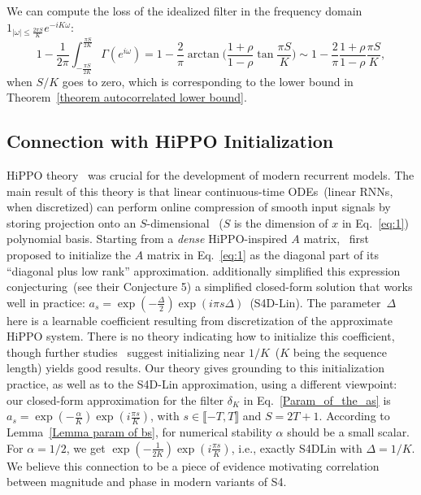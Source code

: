 We can compute the loss of the idealized filter in the frequency domain $1_{|\omega| \leqslant \frac{2\pi S}{K}} e^{-i K \omega }$: 
$$
1 - \frac{1}{2\pi}\int_{-\frac{\pi S}{2K}}^\frac{\pi S}{2K} \Gamma(e^{i\omega}) = 
1 - \frac{2}{\pi}
\arctan \Big(
\frac{1+\rho}{1-\rho}\tan  \frac{\pi S}{K}
\Big) \sim 1 -\frac{2}{\pi}
\frac{1+\rho}{1-\rho}  \frac{\pi S}{K},
$$
when $S/K$ goes to zero, which is corresponding to the lower bound in Theorem~\ref{theorem 
autocorrelated lower bound}.


\subsection{Connection with HiPPO Initialization}
\label{sec:hippo}

HiPPO theory~\citep{gu2020hippo} was crucial for the development of modern recurrent models. The main result of this theory is that linear continuous-time ODEs~(linear RNNs, when discretized) can perform online compression of smooth input signals by storing projection onto an $S$-dimensional ~($S$ is the dimension of $x$ in Eq.~\eqref{eq:1}) polynomial basis. Starting from a \textit{dense} HiPPO-inspired $A$ matrix,~\citet{gupta2022diagonal} first proposed to initialize the $A$ matrix in Eq.~\eqref{eq:1} as the diagonal part of its ``diagonal plus low rank'' approximation. \citet{gu2022parameterization} additionally simplified this expression conjecturing~(see their Conjecture 5) a simplified closed-form solution that works well in practice: $a_s = \exp\left(-\frac{\Delta}{2}\right)  \exp\left(i\pi s\Delta\right)$~(S4D-Lin). The parameter~$\Delta$ here is a learnable coefficient resulting from discretization of the approximate HiPPO system. There is no theory indicating how to initialize this coefficient, though further studies~\citep{gu2023how} suggest initializing near $1/K$~($K$ being the sequence length) yields good results. 
Our theory gives grounding to this initialization practice, as well as to the S4D-Lin approximation, using a different viewpoint: our closed-form approximation for the filter $\delta_K$ in Eq.~\eqref{Param_of_the_as} is $a_s = \exp\left(-\frac{\alpha}{K}\right)\exp\left(i\frac{\pi s}{K}\right)$, with $s \in \llbracket -T, T\rrbracket$ and $S = 2T+1$. According to Lemma~\ref{Lemma param of bs}, for numerical stability $\alpha$ should be a small scalar. For $\alpha=1/2$, we get $\exp\left(-\frac{1}{2K}\right)\exp\left(i\frac{\pi s}{K}\right)$, i.e., exactly S4DLin with $\Delta =1/K$. We believe this connection to be a piece of evidence motivating correlation between magnitude and phase in modern variants of S4.
